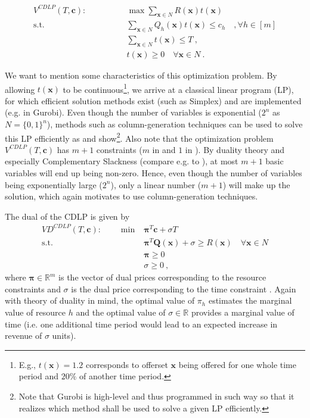 \begin{align}
V^{CDLP}(T, \boldsymbol{c}): \qquad\qquad & \max \sum_{\boldsymbol{x}\in N} R(\boldsymbol{x}) t(\boldsymbol{x})\label{eq:CDLP}\\
\text{s.t. } & \sum_{\boldsymbol{x}\in N} Q_h(\boldsymbol{x}) t(\boldsymbol{x}) \leq c_h \quad, \forall h \in [m]\label{eq:CDLP-m}\\
& \sum_{\boldsymbol{x}\in N} t(\boldsymbol{x}) \leq T~,\label{eq:CDLP-1}\\
& t(\boldsymbol{x}) \geq 0 \quad \forall \boldsymbol{x} \in N~.
\end{align}

We want to mention some characteristics of this optimization problem. By allowing $t(\boldsymbol{x})$ to be continuous\footnote{E.g., $t(\boldsymbol{x})=1.2$ corresponds to offerset $\boldsymbol{x}$ being offered for one whole time period and $20\%$ of another time period.}, we arrive at a classical linear program (LP), for which efficient solution methods exist (such as Simplex) and  are implemented (e.g. in Gurobi). Even though the number of variables is exponential ($2^n$ as $N = \{0,1\}^n$), methods such as column-generation techniques can be used to solve this LP efficiently as \cite{GGallego.} and \cite{Liu.2008} show\footnote{Note that Gurobi is high-level and thus programmed in such way so that it realizes which method shall be used to solve a given LP efficiently.}. Also note that the optimization problem $V^{CDLP}(T, \boldsymbol{c})$ has $m+1$ constraints ($m$ in  and $1$ in ). By duality theory and especially Complementary Slackness (compare e.g. to \cite{Domschke.2015}), at most $m+1$ basic variables will end up being non-zero. Hence, even though the number of variables being exponentially large ($2^n$), only a linear number ($m+1$) will make up the solution, which again motivates to use column-generation techniques.

The dual of the CDLP is given by
\begin{align}
	VD^{CDLP}(T, \boldsymbol{c}): \qquad \min &\boldsymbol{\pi}^T \boldsymbol{c} + \sigma T\\
	\text{s.t.} &\boldsymbol{\pi}^T \boldsymbol{Q}(\boldsymbol{x}) + \sigma \geq R(\boldsymbol{x}) \quad \forall \boldsymbol{x}\in N\\
	& \boldsymbol{\pi} \geq 0\\
	& \sigma \geq 0 ~,
\end{align}
where $\boldsymbol{\pi} \in \mathbb{R}^m$ is the vector of dual prices corresponding to the resource constraints  and $\sigma$ is the dual price corresponding to the time constraint . Again with theory of duality in mind, the optimal value of $\pi_h$ estimates the marginal value of resource $h$ and the optimal value of $\sigma \in \mathbb{R}$ provides a marginal value of time (i.e. one additional time period would lead to an expected increase in revenue of $\sigma$ units).

